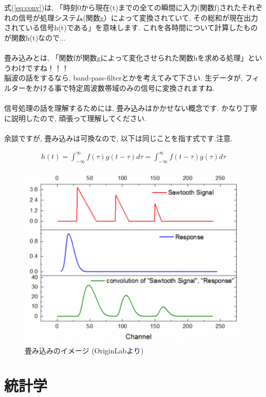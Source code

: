 \documentclass[11pt,a4paper]{jreport}
\begin{document}
式(\ref{eq:conv})は, 「時刻0から現在(t)までの全ての瞬間に入力(関数f)されたそれぞれの信号が処理システム(関数g）によって変換されていて, その総和が現在出力されている信号h(t)である」を意味します. これを各時間について計算したものが関数h(t)なので...\\
\\
畳み込みとは, 「関数fが関数gによって変化させられた関数hを求める処理」というわけですね！！！\\
脳波の話をするなら, band-pass-filterとかを考えてみて下さい. 生データが, フィルターをかける事で特定周波数帯域のみの信号に変換されますね. \\
\\
信号処理の話を理解するためには, 畳み込みはかかせない概念です. かなり丁寧に説明したので, 頑張って理解してください.\\
\\
余談ですが, 畳み込みは可換なので, 以下は同じことを指す式です.注意.

\begin{eqnarray}
h(t) = \int^{\infty}_{-\infty} f(\tau) g(t - \tau) d\tau=
 \int^{\infty}_{-\infty} f(t-\tau) g(\tau) d\tau
\end{eqnarray}

\begin{figure}[H]
\label{im:convolution}
  \centering
  \includegraphics[width=120mm,bb=0 0 350 276]{figures/Convolution.png}
  \caption{畳み込みのイメージ (OriginLabより)}
\end{figure}

\section{統計学}
\end{document}
